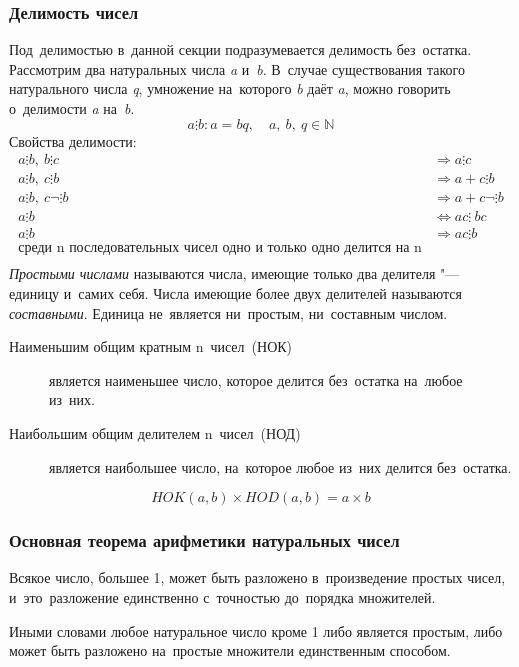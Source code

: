 \documentclass[]{scrartcl}
\begin{document}
\subsubsection{Делимость чисел}
Под~делимостью в~данной секции подразумевается делимость без~остатка. Рассмотрим два натуральных числа \textit{a} и~\textit{b}. В~случае существования такого натурального числа \textit{q}, умножение на~которого \textit{b} даёт \textit{a}, можно говорить о~делимости \textit{a} на~\textit{b}.
\begin{equation}\label{eq:delimostq}
a \vdots b: a=bq,\quad a,\ b,\ q \in \mathbb{N}
\end{equation}
Свойства делимости:
\begin{equation}\label{eq:delimostq-prop}
\begin{aligned}
a \vdots b,\ b \vdots c &\Rightarrow a \vdots c\\
a \vdots b,\ c \vdots b &\Rightarrow a+c \vdots b\\
a \vdots b,\ c \neg \vdots b &\Rightarrow a+c \neg \vdots b\\
a \vdots b &\Leftrightarrow ac \vdots\ bc\\
a \vdots b &\Rightarrow ac \vdots b\\
\text{среди n последовательных чисел одно и~только одно делится на~n}\\
\end{aligned}
\end{equation}
\emph{Простыми числами} называются числа, имеющие только два делителя "--- единицу и~самих себя. Числа имеющие более двух делителей называются \emph{составными}. Единица не~является ни~простым, ни~составным числом.

\begin{description}
	\item[Наименьшим общим кратным n~чисел~(НОК)] является наименьшее число, которое делится без~остатка на~любое из~них.
\end{description}

\begin{description}
	\item[Наибольшим общим делителем n~чисел~(НОД)] является наибольшее число, на~которое любое из~них делится без~остатка.
\end{description}
\begin{equation}\label{eq:Nod-Nok}
HOK(a,b) \times HOD (a,b) = a \times b
\end{equation} 

\subsubsection{Основная теорема арифметики натуральных чисел}
\begin{theorem}
	Всякое число, большее  1,  может быть разложено в~произведение простых чисел, и~это~разложение единственно с~точностью до~порядка множителей.
\end{theorem}
Иными словами любое натуральное число кроме 1 либо является простым, либо может быть разложено на~простые множители единственным способом.
\end{document}
